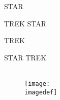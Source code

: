 \thispagestyle{empty}
{
	\vspace*{0.2\textheight}

	\ifbook
		\hfill \huge STAR\hspace{2mm}

		\vspace*{8mm}
		
		\hfill TREK
	\else
		\hfill \huge STAR\hspace{22mm}
		
		\vspace*{8mm}
		
		\hfill TREK\hspace{20mm}
	\fi
}

\cleardoublepage
\thispagestyle{empty}

\ifbook
	\vspace*{1cm}
\else
	\vspace*{5,2cm}
\fi

\begin{center}
	{\Huge STAR TREK}\\
	\vspace{2mm}
	\large{\textit{\titledef}}\\
	\vspace{3mm}
	\begin{figure}[h]
		\centering
			\texttt{[image: \\imagedef]}
	\end{figure}
	\vspace{2mm}
	\large{\authordef}\\
	\normalsize
	\yeardef\\

\end{center}

\newpage

